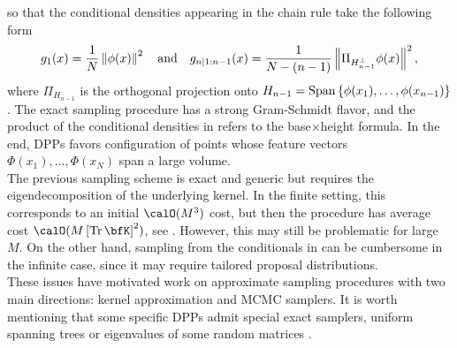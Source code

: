 \documentclass[twoside,11pt]{article}
\begin{document}
      so that the conditional densities appearing in the chain rule take the following form
      \begin{equation}
      \label{eq:conditionals_densities}
        g_1(x) 
          = \frac{1}{N} \left\| \phi(x) \right\|^2 
          \quad\text{and}\quad
        g_{n | 1:n-1}(x) 
          = \frac{1}{N-(n-1)} \left\|  \Pi_{H_{n-1}^{\perp}} \phi(x) \right\|^2,
      \end{equation}
      where $\Pi_{H_{n-1}}$ is the orthogonal projection onto 
      $H_{n-1} = \operatorname{Span}\left\{ \phi(x_1), \dots, \phi(x_{n-1})  \right\}$.
      The exact sampling procedure has a strong Gram-Schmidt flavor, and the product of the conditional densities in  refers to the base$\times$height formula.
      In the end, DPPs favors configuration of points whose feature vectors $\Phi(x_1),\dots, \Phi(x_N)$ span a large volume.\\

      The previous sampling scheme is exact and generic but requires the eigendecomposition of the underlying kernel.
      In the finite setting, this corresponds to an initial $\calO(M^3)$ cost, but then the procedure has average cost $\calO(M\lrb{\Tr \bfK}^2)$, see \citep{TrBaAm18}.
      However, this may still be problematic for large $M$.
      On the other hand, sampling from the conditionals in  can be cumbersome in the infinite case, since it may require tailored proposal distributions.\\
      
      These issues have motivated work on approximate sampling procedures with two main directions: kernel approximation and MCMC samplers.
      It is worth mentioning that some specific DPPs admit special exact samplers, \eg uniform spanning trees \citep{PrWi98} or eigenvalues of some random matrices \citep{DuEd02}.
    
\end{document}
